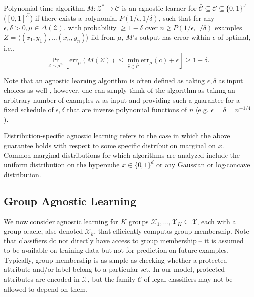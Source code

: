 \documentclass[final, 12pt]{colt2018} %
\newcommand{\eps}{\epsilon}
\newcommand{\err}{\mathrm{err}}
\def\calC{\mathcal{C}}
\def\calX{\mathcal{X}}
\def\calZ{\mathcal{Z}}
\begin{document}
\begin{definition}
Polynomial-time algorithm $M:\calZ^*\rightarrow \calC$ is an agnostic learner for ${\bar{\calC}} \subseteq \calC \subseteq \{0,1\}^\calX$ ($[0,1]^\calX$) if there exists a polynomial $P(1/\eps, 1/\delta)$, such that for any $\eps, \delta>0, \mu \in \Delta(\calZ)$, with probability $\geq 1-\delta$ over $n\geq P(1/\eps, 1/\delta)$ examples $Z = \langle(x_1, y_1), \ldots (x_n, y_n)\rangle$ iid from $\mu$, $M$'s output has error within $\eps$ of optimal, i.e.,
$$\Pr_{Z \sim \mu^n}\left[\err_\mu({M(Z)}) \leq \min_{\bar{c} \in \bar{\calC}} \err_\mu({\bar{c}}) + \eps\right] \geq 1-\delta.$$
\end{definition}
Note that an agnostic learning algorithm is often defined as taking $\eps, \delta$ as input choices as well \citep{Kearns:1992}, however, one can simply think of the algorithm as taking an arbitrary number of examples $n$ as input and providing such a guarantee for a fixed schedule of $\eps, \delta$ that are inverse polynomial functions of $n$ (e.g. $\eps=\delta=n^{-1/4}$).

Distribution-specific agnostic learning refers to the case in which the above guarantee holds with respect to some specific distribution marginal on $x$. Common marginal distributions for which algorithms are analyzed include the uniform distribution on the hypercube $x\in\{0,1\}^d$ or any Gaussian or log-concave distribution.

\subsection{Group Agnostic Learning}\label{sec:learning-meat}

We now consider agnostic learning for $K$ groups $\calX_1, \ldots, \calX_K \subseteq \calX$, each with a group oracle, also denoted $\calX_k$, that efficiently computes group membership. Note that classifiers do not directly have access to group membership -- it is assumed to be available on training data but not for prediction on future examples. Typically, group membership is as simple as checking whether a protected attribute and/or label belong to a particular set. In our model, protected attributes are encoded in $\calX$, %
but the family $\calC$ of legal classifiers may not be allowed to depend on them. 
\end{document}
